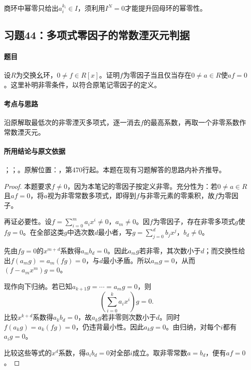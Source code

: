商环中幂零只给出$a_i^{k_i}\in I$，须利用$I^N=0$才能提升回母环的幂零性。



\subsection{习题44：多项式零因子的常数湮灭元判据}

\label{ex:3:44}

\paragraph{题目}

设$R$为交换幺环，$0\ne f\in R[x]$。证明$f$为零因子当且仅当存在$0\ne a\in R$使$af=0$。这里补明非零条件，以符合原笔记零因子的定义。

\paragraph{考点与思路}

沿原解取最低次的非零湮灭多项式，逐一消去$f$的最高系数，再取一个非零系数作常数湮灭元。

\paragraph{所用结论与原文依据}

；；。原解位置：，第470行起。本题在现有习题解答的思路内补齐推导。


\begin{proof}

本题要求$f\ne0$，因为本笔记的零因子按定义非零。充分性为：若$0\ne a\in R$且$af=0$，将$a$视为非零常数多项式，即得到$f$与非零元素的零乘积，故$f$为零因子。

再证必要性。设$f=\sum_{i=0}^m a_ix^i\ne0$，$a_m\ne0$。因$f$为零因子，存在非零多项式$g$使$fg=0$。在全部这类$g$中选次数$d$最小者，写$g=\sum_{j=0}^d b_jx^j$，$b_d\ne0$。

先由$fg=0$的$x^{m+d}$系数得$a_mb_d=0$。因此$a_mg$若非零，其次数小于$d$；而交换性给出$f(a_mg)=a_m(fg)=0$，与$d$最小矛盾。所以$a_mg=0$，从而$(f-a_mx^m)g=0$。

现作向下归纳。若已知$a_{k+1}g=\cdots=a_mg=0$，则
\[
\left(\sum_{i=0}^k a_ix^i\right)g=0.
\]
比较$x^{k+d}$系数得$a_kb_d=0$，故$a_kg$若非零则次数小于$d$。同时$f(a_kg)=a_k(fg)=0$，仍违背最小性。因此$a_kg=0$。由归纳，对每个$i$都有$a_ig=0$。

比较这些等式的$x^d$系数，得$a_ib_d=0$对全部$i$成立。取非零常数$a=b_d$，便有$af=0$。

\end{proof}

